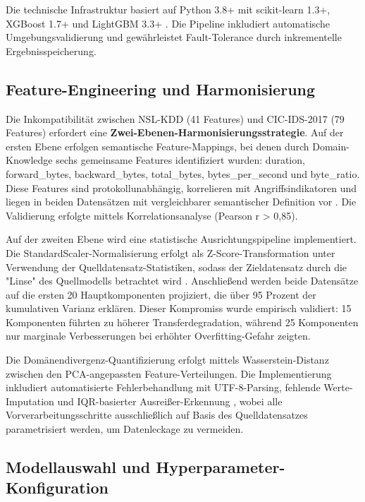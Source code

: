 \documentclass[11pt,a4paper]{article}
\begin{document}
    Die technische Infrastruktur basiert auf Python 3.8+ mit scikit-learn 1.3+, XGBoost 1.7+ und LightGBM 3.3+ \parencite{Weirauch2025}. Die Pipeline inkludiert automatische Umgebungsvalidierung und gewährleistet Fault-Tolerance durch inkrementelle Ergebnisspeicherung.

    \subsection{Feature-Engineering und Harmonisierung}

    Die Inkompatibilität zwischen NSL-KDD (41 Features) und CIC-IDS-2017 (79 Features) erfordert eine \textbf{Zwei-Ebenen-Harmonisierungsstrategie}. Auf der ersten Ebene erfolgen semantische Feature-Mappings, bei denen durch Domain-Knowledge sechs gemeinsame Features identifiziert wurden: duration, forward\_bytes, backward\_bytes, total\_bytes, bytes\_per\_second und byte\_ratio. Diese Features sind protokollunabhängig, korrelieren mit Angriffsindikatoren und liegen in beiden Datensätzen mit vergleichbarer semantischer Definition vor \parencite{Gharib2016}. Die Validierung erfolgte mittels Korrelationsanalyse (Pearson r > 0,85).

    Auf der zweiten Ebene wird eine statistische Ausrichtungspipeline implementiert. Die StandardScaler-Normalisierung erfolgt als Z-Score-Transformation unter Verwendung der Quelldatensatz-Statistiken, sodass der Zieldatensatz durch die "Linse" des Quellmodells betrachtet wird \parencite{Goodfellow2016}. Anschließend werden beide Datensätze auf die ersten 20 Hauptkomponenten projiziert, die über 95 Prozent der kumulativen Varianz erklären. Dieser Kompromiss wurde empirisch validiert: 15 Komponenten führten zu höherer Transferdegradation, während 25 Komponenten nur marginale Verbesserungen bei erhöhter Overfitting-Gefahr zeigten.

    Die Domänendivergenz-Quantifizierung erfolgt mittels Wasserstein-Distanz zwischen den PCA-angepassten Feature-Verteilungen. Die Implementierung inkludiert automatisierte Fehlerbehandlung mit UTF-8-Parsing, fehlende Werte-Imputation und IQR-basierter Ausreißer-Erkennung \parencite{Hastie2009}, wobei alle Vorverarbeitungsschritte ausschließlich auf Basis des Quelldatensatzes parametrisiert werden, um Datenleckage zu vermeiden.


    \subsection{Modellauswahl und Hyperparameter-Konfiguration}
\end{document}
